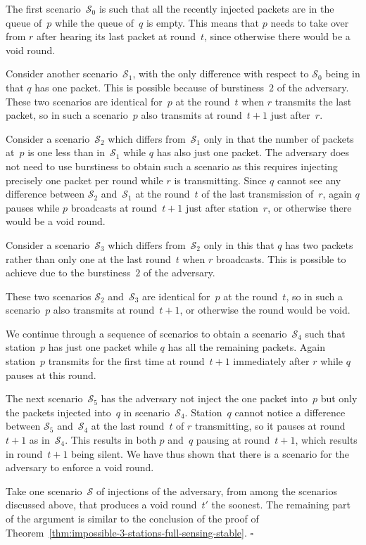 \documentclass[11pt]{article}
\newcommand{\cS}{\mathcal{S}}
\newcommand{\qed}{\hfill $\square$ \smallbreak}
\newenvironment{proof}{\noindent{\bf Proof:}}{\qed}
\begin{document}
\begin{proof}
The first scenario~$\cS_0$ is such that all the recently injected packets are in the queue of~$p$ while the queue of~$q$ is empty.
This means that $p$ needs to take over from $r$ after hearing its last packet at round~$t$, since otherwise there would be a void round.

Consider another scenario~$\cS_1$, with the only difference with respect to $\cS_0$ being in that $q$ has one packet.
This is possible because of burstiness~$2$ of the adversary.
These two scenarios are identical for~$p$ at the round~$t$ when $r$ transmits the last packet, so in such a scenario~$p$ also transmits at round~$t+1$ just after~$r$.

Consider a scenario~$\cS_2$ which differs from~$\cS_1$ only in that the number of packets at~$p$ is one less than in~$\cS_1$ while $q$ has also just one packet.
The adversary does not need to use burstiness to obtain such a scenario as this requires injecting precisely one packet per round while $r$ is transmitting.
Since $q$ cannot see any difference between $\cS_2$ and~$\cS_1$ at the round~$t$ of the last transmission of~$r$, again $q$ pauses while $p$ broadcasts at round~$t+1$ just after station~$r$, or otherwise there would be a void round.

Consider a scenario~$\cS_3$ which differs from~$\cS_2$ only in this that $q$ has two packets rather than only one at the last round~$t$ when $r$ broadcasts.
This is possible to achieve due to the burstiness~$2$ of the adversary.

These two scenarios $\cS_2$ and~$\cS_3$ are identical for~$p$ at the round~$t$, so in such a scenario~$p$ also transmits at round~$t+1$, or otherwise the round would be void.

We continue through a sequence of scenarios to obtain a scenario~$\cS_4$ such that  station~$p$ has just one packet while $q$ has all the remaining packets.
Again station~$p$ transmits for the first time at round~$t+1$ immediately after $r$ while $q$ pauses at this round.

The next scenario~$\cS_5$ has the adversary not inject the one packet into~$p$ but only the packets injected into~$q$ in scenario~$\cS_4$.
Station~$q$ cannot notice a difference between $\cS_5$ and~$\cS_4$ at the last round~$t$ of $r$ transmitting, so it pauses at round~$t+1$ as in~$\cS_4$.
This results in both $p$ and~$q$ pausing at round~$t+1$, which results in round~$t+1$ being silent.
We have thus shown that there is a scenario for the adversary to enforce a void round.

Take one scenario~$\cS$ of injections of the adversary, from among the scenarios discussed above, that produces a void round~$t'$ the soonest.
The remaining part of the argument is similar to the conclusion of the proof of Theorem~\ref{thm:impossible-3-stations-full-sensing-stable}.
\end{proof}
\end{document}
